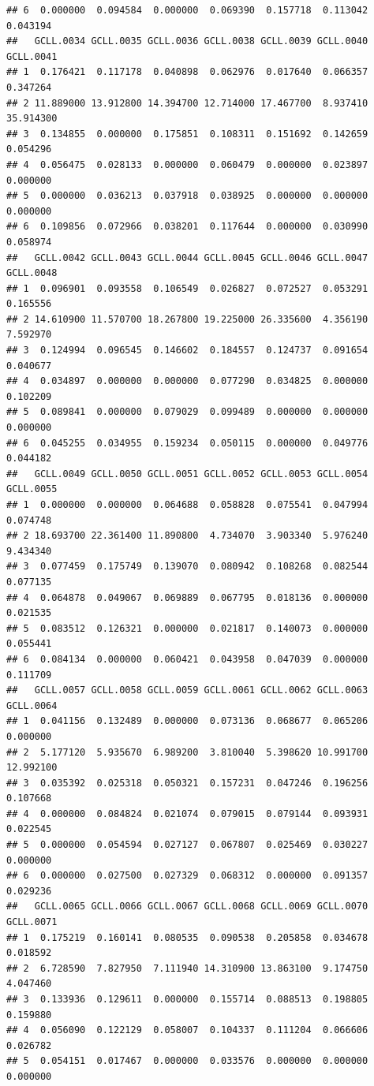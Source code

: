 \documentclass[
]{article}
\begin{document}
\begin{verbatim}
## 6  0.000000  0.094584  0.000000  0.069390  0.157718  0.113042  0.043194
##   GCLL.0034 GCLL.0035 GCLL.0036 GCLL.0038 GCLL.0039 GCLL.0040 GCLL.0041
## 1  0.176421  0.117178  0.040898  0.062976  0.017640  0.066357  0.347264
## 2 11.889000 13.912800 14.394700 12.714000 17.467700  8.937410 35.914300
## 3  0.134855  0.000000  0.175851  0.108311  0.151692  0.142659  0.054296
## 4  0.056475  0.028133  0.000000  0.060479  0.000000  0.023897  0.000000
## 5  0.000000  0.036213  0.037918  0.038925  0.000000  0.000000  0.000000
## 6  0.109856  0.072966  0.038201  0.117644  0.000000  0.030990  0.058974
##   GCLL.0042 GCLL.0043 GCLL.0044 GCLL.0045 GCLL.0046 GCLL.0047 GCLL.0048
## 1  0.096901  0.093558  0.106549  0.026827  0.072527  0.053291  0.165556
## 2 14.610900 11.570700 18.267800 19.225000 26.335600  4.356190  7.592970
## 3  0.124994  0.096545  0.146602  0.184557  0.124737  0.091654  0.040677
## 4  0.034897  0.000000  0.000000  0.077290  0.034825  0.000000  0.102209
## 5  0.089841  0.000000  0.079029  0.099489  0.000000  0.000000  0.000000
## 6  0.045255  0.034955  0.159234  0.050115  0.000000  0.049776  0.044182
##   GCLL.0049 GCLL.0050 GCLL.0051 GCLL.0052 GCLL.0053 GCLL.0054 GCLL.0055
## 1  0.000000  0.000000  0.064688  0.058828  0.075541  0.047994  0.074748
## 2 18.693700 22.361400 11.890800  4.734070  3.903340  5.976240  9.434340
## 3  0.077459  0.175749  0.139070  0.080942  0.108268  0.082544  0.077135
## 4  0.064878  0.049067  0.069889  0.067795  0.018136  0.000000  0.021535
## 5  0.083512  0.126321  0.000000  0.021817  0.140073  0.000000  0.055441
## 6  0.084134  0.000000  0.060421  0.043958  0.047039  0.000000  0.111709
##   GCLL.0057 GCLL.0058 GCLL.0059 GCLL.0061 GCLL.0062 GCLL.0063 GCLL.0064
## 1  0.041156  0.132489  0.000000  0.073136  0.068677  0.065206  0.000000
## 2  5.177120  5.935670  6.989200  3.810040  5.398620 10.991700 12.992100
## 3  0.035392  0.025318  0.050321  0.157231  0.047246  0.196256  0.107668
## 4  0.000000  0.084824  0.021074  0.079015  0.079144  0.093931  0.022545
## 5  0.000000  0.054594  0.027127  0.067807  0.025469  0.030227  0.000000
## 6  0.000000  0.027500  0.027329  0.068312  0.000000  0.091357  0.029236
##   GCLL.0065 GCLL.0066 GCLL.0067 GCLL.0068 GCLL.0069 GCLL.0070 GCLL.0071
## 1  0.175219  0.160141  0.080535  0.090538  0.205858  0.034678  0.018592
## 2  6.728590  7.827950  7.111940 14.310900 13.863100  9.174750  4.047460
## 3  0.133936  0.129611  0.000000  0.155714  0.088513  0.198805  0.159880
## 4  0.056090  0.122129  0.058007  0.104337  0.111204  0.066606  0.026782
## 5  0.054151  0.017467  0.000000  0.033576  0.000000  0.000000  0.000000

\end{verbatim}
\end{document}
